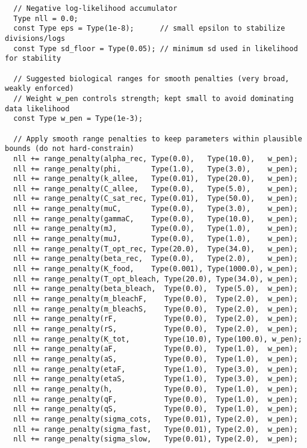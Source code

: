 \begin{lstlisting}
  // Negative log-likelihood accumulator
  Type nll = 0.0;
  const Type eps = Type(1e-8);      // small epsilon to stabilize divisions/logs
  const Type sd_floor = Type(0.05); // minimum sd used in likelihood for stability

  // Suggested biological ranges for smooth penalties (very broad, weakly enforced)
  // Weight w_pen controls strength; kept small to avoid dominating data likelihood
  const Type w_pen = Type(1e-3);

  // Apply smooth range penalties to keep parameters within plausible bounds (do not hard-constrain)
  nll += range_penalty(alpha_rec, Type(0.0),   Type(10.0),   w_pen);
  nll += range_penalty(phi,       Type(1.0),   Type(3.0),    w_pen);
  nll += range_penalty(k_allee,   Type(0.01),  Type(20.0),   w_pen);
  nll += range_penalty(C_allee,   Type(0.0),   Type(5.0),    w_pen);
  nll += range_penalty(C_sat_rec, Type(0.01),  Type(50.0),   w_pen);
  nll += range_penalty(muC,       Type(0.0),   Type(3.0),    w_pen);
  nll += range_penalty(gammaC,    Type(0.0),   Type(10.0),   w_pen);
  nll += range_penalty(mJ,        Type(0.0),   Type(1.0),    w_pen);
  nll += range_penalty(muJ,       Type(0.0),   Type(1.0),    w_pen);
  nll += range_penalty(T_opt_rec, Type(20.0),  Type(34.0),   w_pen);
  nll += range_penalty(beta_rec,  Type(0.0),   Type(2.0),    w_pen);
  nll += range_penalty(K_food,    Type(0.001), Type(1000.0), w_pen);
  nll += range_penalty(T_opt_bleach, Type(20.0), Type(34.0), w_pen);
  nll += range_penalty(beta_bleach,  Type(0.0),  Type(5.0),  w_pen);
  nll += range_penalty(m_bleachF,    Type(0.0),  Type(2.0),  w_pen);
  nll += range_penalty(m_bleachS,    Type(0.0),  Type(2.0),  w_pen);
  nll += range_penalty(rF,           Type(0.0),  Type(2.0),  w_pen);
  nll += range_penalty(rS,           Type(0.0),  Type(2.0),  w_pen);
  nll += range_penalty(K_tot,        Type(10.0), Type(100.0), w_pen);
  nll += range_penalty(aF,           Type(0.0),  Type(1.0),  w_pen);
  nll += range_penalty(aS,           Type(0.0),  Type(1.0),  w_pen);
  nll += range_penalty(etaF,         Type(1.0),  Type(3.0),  w_pen);
  nll += range_penalty(etaS,         Type(1.0),  Type(3.0),  w_pen);
  nll += range_penalty(h,            Type(0.0),  Type(1.0),  w_pen);
  nll += range_penalty(qF,           Type(0.0),  Type(1.0),  w_pen);
  nll += range_penalty(qS,           Type(0.0),  Type(1.0),  w_pen);
  nll += range_penalty(sigma_cots,   Type(0.01), Type(2.0),  w_pen);
  nll += range_penalty(sigma_fast,   Type(0.01), Type(2.0),  w_pen);
  nll += range_penalty(sigma_slow,   Type(0.01), Type(2.0),  w_pen);


\end{lstlisting}
